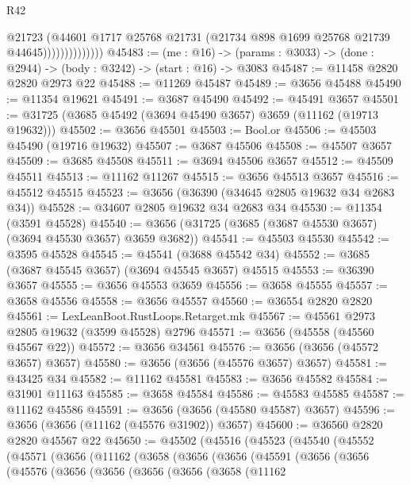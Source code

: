 \begin{lexlean}{R42}
\begin{coremodule}
                            @21723
                            (@44601
                              @1717
                              @25768
                              @21731
                              (@21734 @898 @1699 @25768 @21739 @44645))))))))))))))
@45483 := (me : @16) ->
  (params : @3033) -> (done : @2944) -> (body : @3242) -> (start : @16) -> @3083
@45487 := @11458 @2820 @2820 @2973 @22
@45488 := @11269 @45487
@45489 := @3656 @45488
@45490 := @11354 @19621
@45491 := @3687 @45490
@45492 := @45491 @3657
@45501 := @31725 (@3685 @45492 (@3694 @45490 @3657) @3659 (@11162 (@19713 @19632)))
@45502 := @3656 @45501
@45503 := Bool.or
@45506 := @45503 @45490 (@19716 @19632)
@45507 := @3687 @45506
@45508 := @45507 @3657
@45509 := @3685 @45508
@45511 := @3694 @45506 @3657
@45512 := @45509 @45511
@45513 := @11162 @11267
@45515 := @3656 @45513 @3657
@45516 := @45512 @45515
@45523 := @3656 (@36390 (@34645 @2805 @19632 @34 @2683 @34))
@45528 := @34607 @2805 @19632 @34 @2683 @34
@45530 := @11354 (@3591 @45528)
@45540 := @3656 (@31725 (@3685 (@3687 @45530 @3657) (@3694 @45530 @3657) @3659 @3682))
@45541 := @45503 @45530
@45542 := @3595 @45528
@45545 := @45541 (@3688 @45542 @34)
@45552 := @3685 (@3687 @45545 @3657) (@3694 @45545 @3657) @45515
@45553 := @36390 @3657
@45555 := @3656 @45553 @3659
@45556 := @3658 @45555
@45557 := @3658 @45556
@45558 := @3656 @45557
@45560 := @36554 @2820 @2820
@45561 := LexLeanBoot.RustLoops.Retarget.mk
@45567 := @45561 @2973 @2805 @19632 (@3599 @45528) @2796
@45571 := @3656 (@45558 (@45560 @45567 @22))
@45572 := @3656 @34561
@45576 := @3656 (@3656 (@45572 @3657) @3657)
@45580 := @3656 (@3656 (@45576 @3657) @3657)
@45581 := @43425 @34
@45582 := @11162 @45581
@45583 := @3656 @45582
@45584 := @31901 @11163
@45585 := @3658 @45584
@45586 := @45583 @45585
@45587 := @11162 @45586
@45591 := @3656 (@3656 (@45580 @45587) @3657)
@45596 := @3656 (@3656 (@11162 (@45576 @31902)) @3657)
@45600 := @36560 @2820 @2820 @45567 @22
@45650 := @45502
    (@45516
      (@45523
        (@45540
          (@45552
            (@45571
              (@3656
                (@11162
                  (@3658
                    (@3656
                      (@3656
                        (@45591
                          (@3656
                            (@3656
                              (@45576
                                (@3656
                                  (@3656
                                    (@3656
                                      (@3656
                                        (@3658
                                          (@11162

\end{coremodule}
\end{lexlean}

